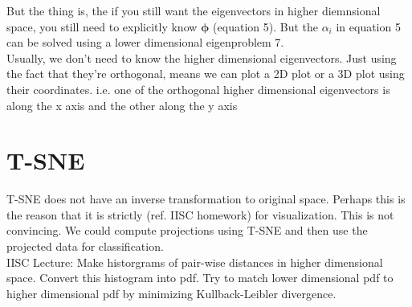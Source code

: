 \documentclass{article}
\begin{document}
But the thing is, the if you still want the eigenvectors in higher diemnsional space, you still need to explicitly know $\pmb{\phi}$ (equation 5). But the $\alpha_i$ in equation 5 can be solved using a lower dimensional eigenproblem 7. \\

Usually, we don't need to know the higher dimensional eigenvectors. Just using the fact that they're orthogonal, means we can plot a 2D plot or a 3D plot using their coordinates. i.e. one of the orthogonal higher dimensional eigenvectors is along the x axis and the other along the y axis

\section{T-SNE}
T-SNE does not have an inverse transformation to original space. Perhaps this is the reason that it is strictly (ref. IISC homework) for visualization. This is not convincing. We could compute projections using T-SNE and then use the projected data for classification.\\

IISC Lecture: Make historgrams of pair-wise distances in higher dimensional space. Convert this histogram into  pdf. Try to match lower dimensional pdf to higher dimensional pdf by minimizing Kullback-Leibler divergence.
\end{document}
